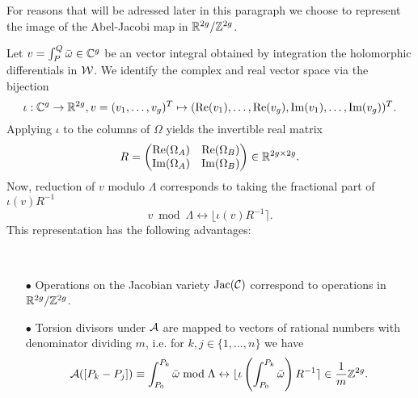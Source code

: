 \documentclass[main.tex]{subfiles}
\begin{document}
   For reasons that will be adressed later in this paragraph
   we choose to
   represent the image of the Abel-Jacobi map in 
    $\mathbb{R}^{2g} / \mathbb{Z}^{2g}$.
    
   Let $v = \int_P^Q \bar{\omega} \in \mathbb{C}^g$ be an vector integral obtained by integration the holomorphic differentials in
   $\mathcal{W}$.
   We identify the complex and real vector space via the bijection
   \begin{equation}
    \iota:\mathbb{C}^g \rightarrow \mathbb{R}^{2g},v = (v_1,\dots,v_g)^T \mapsto (\operatorname{Re}(v_1),\dots,\operatorname{Re}(v_g),\operatorname{Im}(v_1),\dots,\operatorname{Im}(v_g))^T.
   \end{equation}
    Applying $\iota$ to the columns of $\Omega$ yields the invertible real matrix
   \begin{equation}
    R = 
   \begin{pmatrix}
     \operatorname{Re}(\Omega_A) & \operatorname{Re}(\Omega_B) \\
     \operatorname{Im}(\Omega_A) & \operatorname{Im}(\Omega_B)
    \end{pmatrix} \in \mathbb{R}^{2g \times 2g}.
   \end{equation}
   Now, reduction of $v$ modulo $\Lambda$ corresponds to taking the fractional part of $\iota(v)R^{-1}$
   \begin{equation}
    v \bmod \Lambda \leftrightarrow \lfloor \iota(v)R^{-1} \rceil.
   \end{equation}
   This representation has the following advantages:
   \begin{rmk} \
    \begin{itemize}
     \item[$\bullet$] Operations on the Jacobian variety $\operatorname{Jac}(\mathcal{C})$ correspond to operations in $\mathbb{R}^{2g}/\mathbb{Z}^{2g}$.
     \item[$\bullet$] Torsion divisors under $\mathcal{A}$ are mapped to vectors of rational numbers with 
     denominator dividing $m$, i.e. for $k,j \in \{ 1,\dots,n \}$ we have
     \begin{equation}
      \mathcal{A}([P_k - P_j]) \equiv \int_{P_0}^{P_k} \bar{\omega} \bmod \Lambda \leftrightarrow \lfloor \iota\left(\int_{P_0}^{P_k} \bar{\omega}\right)
      R^{-1} \rceil \in \frac{1}m\mathbb{Z}^{2g}.
     \end{equation}
   
    \end{itemize}

    
   \end{rmk}

   
   
   
    

\biblio
\end{document}

